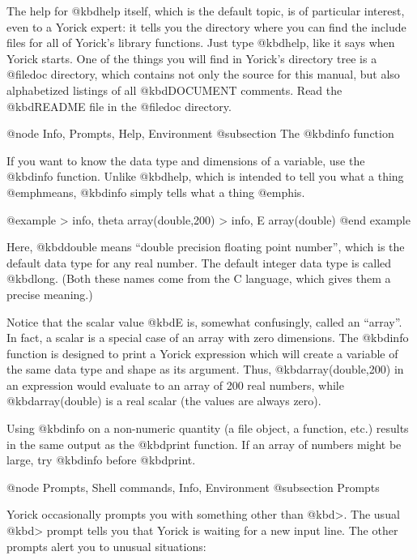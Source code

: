 {The help for @kbd{help} itself, which is the default topic, is of
particular interest, even to a Yorick expert: it tells you the
directory where you can find the include files for all of Yorick's
library functions.  Just type @kbd{help}, like it says when Yorick
starts.  One of the things you will find in Yorick's directory tree is
a @file{doc} directory, which contains not only the source for this
manual, but also alphabetized listings of all @kbd{DOCUMENT} comments.
Read the @kbd{README} file in the @file{doc} directory.


@node Info, Prompts, Help, Environment
@subsection The @kbd{info} function

If you want to know the data type and dimensions of a variable, use
the @kbd{info} function.  Unlike @kbd{help}, which is intended to tell
you what a thing @emph{means}, @kbd{info} simply tells what a thing
@emph{is}.

@example
> info, theta
 array(double,200)
> info, E
 array(double)
@end example

Here, @kbd{double} means ``double precision floating point number'',
which is the default data type for any real number.  The default
integer data type is called @kbd{long}.  (Both these names come from
the C language, which gives them a precise meaning.)

Notice that the scalar value @kbd{E} is, somewhat confusingly, called
an ``array''.  In fact, a scalar is a special case of an array with
zero dimensions.  The @kbd{info} function is designed to print a Yorick
expression which will create a variable of the same data type and
shape as its argument.  Thus, @kbd{array(double,200)} in an expression
would evaluate to an array of 200 real numbers, while
@kbd{array(double)} is a real scalar (the values are always
zero).

Using @kbd{info} on a non-numeric quantity (a file object, a function,
etc.) results in the same output as the @kbd{print} function.  If an
array of numbers might be large, try @kbd{info} before
@kbd{print}.


@node Prompts, Shell commands, Info, Environment
@subsection Prompts

Yorick occasionally prompts you with something other than @kbd{>}.
The usual @kbd{>} prompt tells you that Yorick is waiting for a new
input line.  The other prompts alert you to unusual situations:

}
